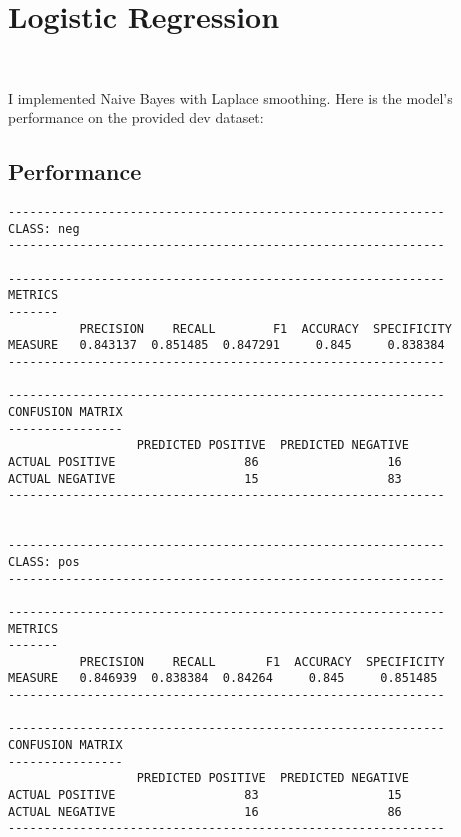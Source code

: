 \newcommand{\sperse}[2]{\multirow{#1}{.2\linewidth}{#2}}

\section{Logistic Regression}~\label{sec:introduction}

I implemented Naive Bayes with Laplace smoothing.
Here is the model's performance on the provided dev dataset:

\subsection{Performance}

\begin{center}
\begin{verbatim}
-------------------------------------------------------------
CLASS: neg
-------------------------------------------------------------

-------------------------------------------------------------
METRICS
-------
          PRECISION    RECALL        F1  ACCURACY  SPECIFICITY
MEASURE   0.843137  0.851485  0.847291     0.845     0.838384
-------------------------------------------------------------

-------------------------------------------------------------
CONFUSION MATRIX
----------------
                  PREDICTED POSITIVE  PREDICTED NEGATIVE
ACTUAL POSITIVE                  86                  16
ACTUAL NEGATIVE                  15                  83
-------------------------------------------------------------


-------------------------------------------------------------
CLASS: pos
-------------------------------------------------------------

-------------------------------------------------------------
METRICS
-------
          PRECISION    RECALL       F1  ACCURACY  SPECIFICITY
MEASURE   0.846939  0.838384  0.84264     0.845     0.851485
-------------------------------------------------------------

-------------------------------------------------------------
CONFUSION MATRIX
----------------
                  PREDICTED POSITIVE  PREDICTED NEGATIVE
ACTUAL POSITIVE                  83                  15
ACTUAL NEGATIVE                  16                  86
-------------------------------------------------------------
\end{verbatim}
\end{center}

